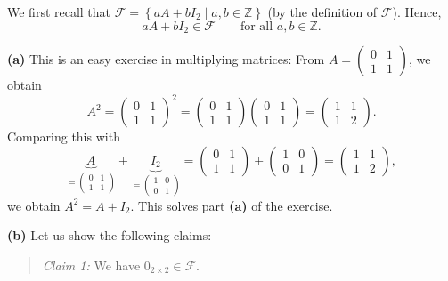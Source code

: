 \documentclass[paper=a4, fontsize=12pt]{scrartcl}%
\theoremstyle{plainsl}
\theoremstyle{definition}
\theoremstyle{remark}
\newenvironment{statement}{\begin{quote}}{\end{quote}}
\begin{document}
We first recall that $\mathcal{F}=\left\{  aA+bI_{2}\mid a,b\in\mathbb{Z}%
\right\}  $ (by the definition of $\mathcal{F}$). Hence,%
\begin{equation}
aA+bI_{2}\in\mathcal{F}\qquad\text{for all }a,b\in\mathbb{Z}.
\label{sol.ring.fibonacci.F.aA+binF}%
\end{equation}


\bigskip

\textbf{(a)} This is an easy exercise in multiplying matrices: From $A=%
\begin{pmatrix}
0 & 1\\
1 & 1
\end{pmatrix}
$, we obtain%
\[
A^{2}=%
\begin{pmatrix}
0 & 1\\
1 & 1
\end{pmatrix}
^{2}=%
\begin{pmatrix}
0 & 1\\
1 & 1
\end{pmatrix}%
\begin{pmatrix}
0 & 1\\
1 & 1
\end{pmatrix}
=%
\begin{pmatrix}
1 & 1\\
1 & 2
\end{pmatrix}
.
\]
Comparing this with%
\[
\underbrace{A}_{=%
\begin{pmatrix}
0 & 1\\
1 & 1
\end{pmatrix}
}+\underbrace{I_{2}}_{=%
\begin{pmatrix}
1 & 0\\
0 & 1
\end{pmatrix}
}=%
\begin{pmatrix}
0 & 1\\
1 & 1
\end{pmatrix}
+%
\begin{pmatrix}
1 & 0\\
0 & 1
\end{pmatrix}
=%
\begin{pmatrix}
1 & 1\\
1 & 2
\end{pmatrix}
,
\]
we obtain $A^{2}=A+I_{2}$. This solves part \textbf{(a)} of the exercise.

\bigskip

\textbf{(b)} Let us show the following claims:

\begin{statement}
\textit{Claim 1:} We have $0_{2\times2}\in\mathcal{F}$.
\end{statement}
\end{document}
